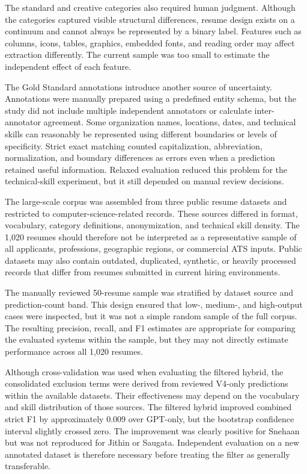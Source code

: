 \documentclass[conference]{IEEEtran}
\begin{document}
The standard and creative categories also required human judgment.
Although the categories captured visible structural differences, resume
design exists on a continuum and cannot always be represented by a
binary label. Features such as columns, icons, tables, graphics, embedded
fonts, and reading order may affect extraction differently. The current
sample was too small to estimate the independent effect of each feature.

The Gold Standard annotations introduce another source of uncertainty.
Annotations were manually prepared using a predefined entity schema, but
the study did not include multiple independent annotators or calculate
inter-annotator agreement. Some organization names, locations, dates, and
technical skills can reasonably be represented using different boundaries
or levels of specificity. Strict exact matching counted capitalization,
abbreviation, normalization, and boundary differences as errors even when
a prediction retained useful information. Relaxed evaluation reduced this
problem for the technical-skill experiment, but it still depended on
manual review decisions.

The large-scale corpus was assembled from three public resume datasets
and restricted to computer-science-related records. These sources differed
in format, vocabulary, category definitions, anonymization, and technical
skill density. The 1,020 resumes should therefore not be interpreted as a
representative sample of all applicants, professions, geographic regions,
or commercial ATS inputs. Public datasets may also contain outdated,
duplicated, synthetic, or heavily processed records that differ from
resumes submitted in current hiring environments.

The manually reviewed 50-resume sample was stratified by dataset source
and prediction-count band. This design ensured that low-, medium-, and
high-output cases were inspected, but it was not a simple random sample
of the full corpus. The resulting precision, recall, and F1 estimates are
appropriate for comparing the evaluated systems within the sample, but
they may not directly estimate performance across all 1,020 resumes.

Although cross-validation was used when evaluating the filtered hybrid,
the consolidated exclusion terms were derived from reviewed V4-only
predictions within the available datasets. Their effectiveness may depend
on the vocabulary and skill distribution of those sources. The filtered
hybrid improved combined strict F1 by approximately 0.009 over GPT-only,
but the bootstrap confidence interval slightly crossed zero. The
improvement was clearly positive for Snehaan but was not reproduced for
Jithin or Saugata. Independent evaluation on a new annotated dataset is
therefore necessary before treating the filter as generally transferable.
\end{document}
